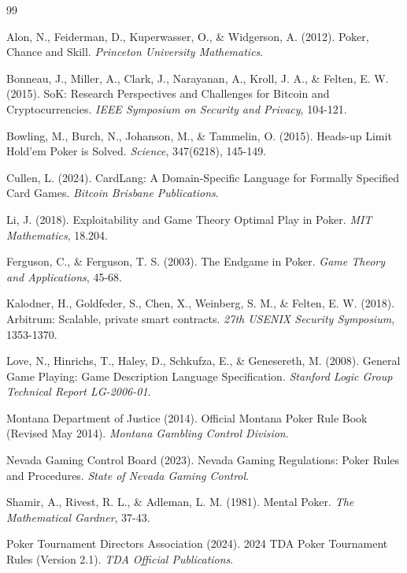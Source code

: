 \documentclass[11pt,a4paper]{article}
\begin{document}

\begin{thebibliography}{99}

Alon, N., Feiderman, D., Kuperwasser, O., \& Widgerson, A. (2012).
Poker, Chance and Skill.
\textit{Princeton University Mathematics}.

Bonneau, J., Miller, A., Clark, J., Narayanan, A., Kroll, J. A., \& Felten, E. W. (2015).
SoK: Research Perspectives and Challenges for Bitcoin and Cryptocurrencies.
\textit{IEEE Symposium on Security and Privacy}, 104-121.

Bowling, M., Burch, N., Johanson, M., \& Tammelin, O. (2015).
Heads-up Limit Hold'em Poker is Solved.
\textit{Science}, 347(6218), 145-149.

Cullen, L. (2024).
CardLang: A Domain-Specific Language for Formally Specified Card Games.
\textit{Bitcoin Brisbane Publications}.

Li, J. (2018).
Exploitability and Game Theory Optimal Play in Poker.
\textit{MIT Mathematics}, 18.204.

Ferguson, C., \& Ferguson, T. S. (2003).
The Endgame in Poker.
\textit{Game Theory and Applications}, 45-68.

Kalodner, H., Goldfeder, S., Chen, X., Weinberg, S. M., \& Felten, E. W. (2018).
Arbitrum: Scalable, private smart contracts.
\textit{27th USENIX Security Symposium}, 1353-1370.

Love, N., Hinrichs, T., Haley, D., Schkufza, E., \& Genesereth, M. (2008).
General Game Playing: Game Description Language Specification.
\textit{Stanford Logic Group Technical Report LG-2006-01}.

Montana Department of Justice (2014).
Official Montana Poker Rule Book (Revised May 2014).
\textit{Montana Gambling Control Division}.

Nevada Gaming Control Board (2023).
Nevada Gaming Regulations: Poker Rules and Procedures.
\textit{State of Nevada Gaming Control}.

Shamir, A., Rivest, R. L., \& Adleman, L. M. (1981).
Mental Poker.
\textit{The Mathematical Gardner}, 37-43.

Poker Tournament Directors Association (2024).
2024 TDA Poker Tournament Rules (Version 2.1).
\textit{TDA Official Publications}.


\end{thebibliography}
\end{document}
